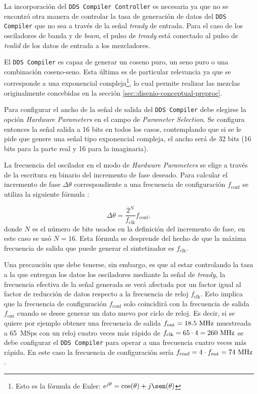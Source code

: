 \documentclass[../../main.tex]{subfiles}
\begin{document}
La incorporación del \texttt{DDS Compiler Controller} es necesaria ya que no se encontró otra manera de controlar la tasa de generación de datos del \texttt{DDS Compiler} que no sea a través de la señal \textit{tready} de entrada. Para el caso de los osciladores de banda y de \textit{beam}, el pulso de \textit{tready} está conectado al pulso de \textit{tvalid} de los datos de entrada a los mezcladores.

El \texttt{DDS Compiler} es capaz de generar un coseno puro, un seno puro o una combinación coseno-seno. Esta última es de particular relevancia ya que se corresponde a una exponencial compleja\footnote{Esto es la fórmula de Euler: $e^{j \theta} = \cos(\theta) + j\sen(\theta)$}, lo cual permite realizar las mezclas originalmente concebidas en la sección \ref{sec::disenio-conceptual-preproc}.

Para configurar el ancho de la señal de salida del \texttt{DDS Compiler} debe elegirse la opción \textit{Hardware Parameters} en el campo de \textit{Parameter Selection}. Se configura entonces la señal salida a 16 bits en todos los casos, contemplando que si se le pide que genere una señal tipo exponencial compleja, el ancho será de 32 bits (16 bits para la parte real y 16 para la imaginaria).

La frecuencia del oscilador en el modo de \textit{Hardware Parameters} se elige a través de la escritura en binario del incremento de fase deseado. Para calcular el incremento de fase $\Delta \theta$ correspondiente a una frecuencia de configuración $f_\textrm{conf}$ se utiliza la siguiente fórmula \cite[p. 17]{dds-compiler}:

\begin{equation}
     \Delta \theta = \frac{2^N}{f_\textrm{clk}} f_\textrm{conf},
     \label{eq::calculo-incremento-fase}
\end{equation}
donde $N$ es el número de bits usados en la definición del incremento de fase, en este caso se usó $N = 16$. Esta fórmula se desprende del hecho de que la máxima frecuencia de salida que puede generar el sintetizador es $f_\textrm{clk}$.

Una precaución que debe tenerse, sin embargo, es que al estar controlando la tasa a la que entregan los datos los osciladores mediante la señal de \textit{tready}, la frecuencia efectiva de la señal generada se verá afectada por un factor igual al factor de reducción de datos respecto a la frecuencia de reloj $f_\textrm{clk}$. 
Esto implica que la frecuencia de configuración $f_\textrm{conf}$ solo coincidirá con la frecuencia de salida $f_\textrm{out}$ cuando se desee generar un dato nuevo por ciclo de reloj. 
Es decir, si se quiere por ejemplo obtener una frecuencia de salida $f_\textrm{out} = 18.5~\textrm{MHz}$ muestreada a 65~MSps con un reloj cuatro veces más rápido de $f_\textrm{clk} = 65 \cdot 4 = 260~\textrm{MHz}$ se debe configurar el \texttt{DDS Compiler} para operar a una frecuencia cuatro veces más rápida. En este caso la frecuencia de configuración sería $f_\textrm{conf} = 4 \cdot f_\textrm{out} = 74~\textrm{MHz}$.
\end{document}
